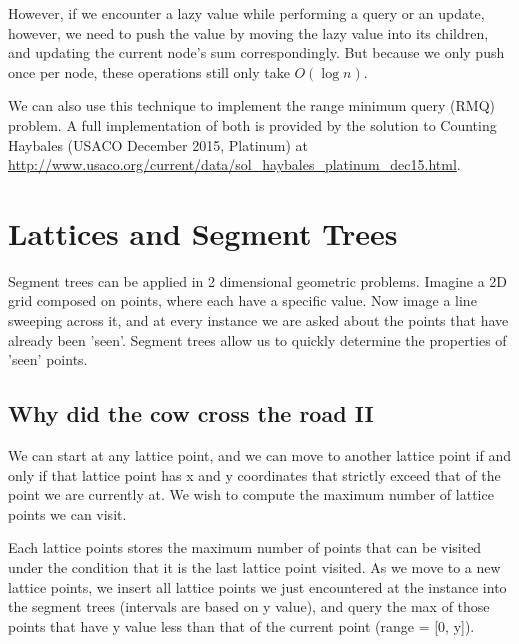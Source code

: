 \documentclass[11pt]{article}
\begin{document}
However, if we encounter a lazy value while performing a query or an update, however, we need to push the value by moving the lazy value into its children, and updating the current node's sum correspondingly. But because we only push once per node, these operations still only take $O(\log n)$.

We can also use this technique to implement the range minimum query (RMQ) problem. A full implementation of both is provided by the solution to Counting Haybales (USACO December 2015, Platinum) at \url{http://www.usaco.org/current/data/sol_haybales_platinum_dec15.html}.

\section{Lattices and Segment Trees}
Segment trees can be applied in 2 dimensional geometric problems. Imagine a 2D grid composed on points, where each have a specific value. Now image a line sweeping across it, and at every instance we are asked about the points that have already been 'seen'. Segment trees allow us to quickly determine the properties of 'seen' points.

\subsection{Why did the cow cross the road II}
We can start at any lattice point, and we can move to another lattice point if and only if that lattice point has x and y coordinates that strictly exceed that of the point we are currently at. We wish to compute the maximum number of lattice points we can visit.

Each lattice points stores the maximum number of points that can be visited under the condition that it is the last lattice point visited. As we move to a new lattice points, we insert all lattice points we just encountered at the instance into the segment trees (intervals are based on y value), and query the max of those points that have y value less than that of the current point (range = [0, y]).  
\end{document}

